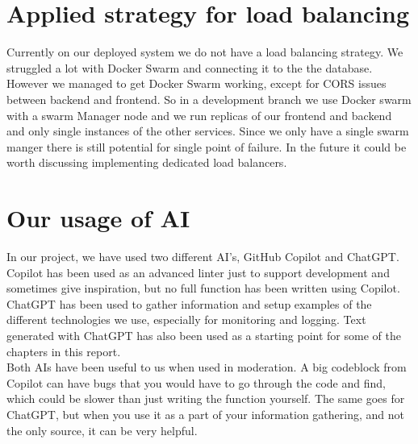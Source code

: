 \section{Applied strategy for load balancing}

Currently on our deployed system we do not have a load balancing strategy. We struggled a lot with Docker Swarm and connecting it to the the database. However we managed to get Docker Swarm working, except for CORS issues between backend and frontend. So in a development branch we use Docker swarm with a swarm Manager node and we run replicas of our frontend and backend and only single instances of the other services. Since we only have a single swarm manger there is still potential for single point of failure. In the future it could be worth discussing implementing dedicated load balancers. 

\section{Our usage of AI}
In our project, we have used two different AI's, GitHub Copilot and ChatGPT. Copilot has been used as an advanced linter just to support development and sometimes give inspiration, but no full function has been written using Copilot. ChatGPT has been used to gather information and setup examples of the different technologies we use, especially for monitoring and logging. Text generated with ChatGPT has also been used as a starting point for some of the chapters in this report. \\

Both AIs have been useful to us when used in moderation. A big codeblock from Copilot can have bugs that you would have to go through the code and find, which could be slower than just writing the function yourself. The same goes for ChatGPT, but when you use it as a part of your information gathering, and not the only source, it can be very helpful.
